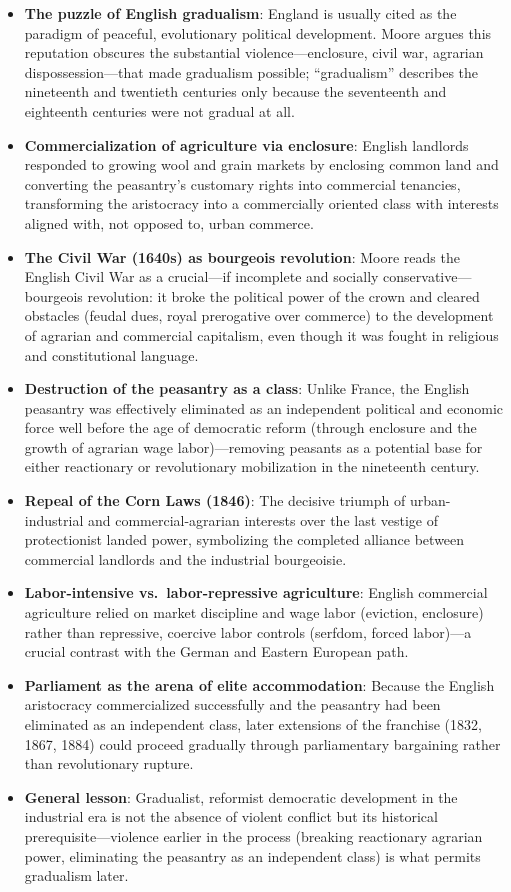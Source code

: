\documentclass[12pt]{article}
\begin{document}
\begin{itemize}[leftmargin=*, itemsep=4pt]
    \item \textbf{The puzzle of English gradualism}: England is usually cited as the paradigm of peaceful, evolutionary political development. Moore argues this reputation obscures the substantial violence---enclosure, civil war, agrarian dispossession---that made gradualism possible; ``gradualism'' describes the nineteenth and twentieth centuries only because the seventeenth and eighteenth centuries were not gradual at all.
    \item \textbf{Commercialization of agriculture via enclosure}: English landlords responded to growing wool and grain markets by enclosing common land and converting the peasantry's customary rights into commercial tenancies, transforming the aristocracy into a commercially oriented class with interests aligned with, not opposed to, urban commerce.
    \item \textbf{The Civil War (1640s) as bourgeois revolution}: Moore reads the English Civil War as a crucial---if incomplete and socially conservative---bourgeois revolution: it broke the political power of the crown and cleared obstacles (feudal dues, royal prerogative over commerce) to the development of agrarian and commercial capitalism, even though it was fought in religious and constitutional language.
    \item \textbf{Destruction of the peasantry as a class}: Unlike France, the English peasantry was effectively eliminated as an independent political and economic force well before the age of democratic reform (through enclosure and the growth of agrarian wage labor)---removing peasants as a potential base for either reactionary or revolutionary mobilization in the nineteenth century.
    \item \textbf{Repeal of the Corn Laws (1846)}: The decisive triumph of urban-industrial and commercial-agrarian interests over the last vestige of protectionist landed power, symbolizing the completed alliance between commercial landlords and the industrial bourgeoisie.
    \item \textbf{Labor-intensive vs.\ labor-repressive agriculture}: English commercial agriculture relied on market discipline and wage labor (eviction, enclosure) rather than repressive, coercive labor controls (serfdom, forced labor)---a crucial contrast with the German and Eastern European path.
    \item \textbf{Parliament as the arena of elite accommodation}: Because the English aristocracy commercialized successfully and the peasantry had been eliminated as an independent class, later extensions of the franchise (1832, 1867, 1884) could proceed gradually through parliamentary bargaining rather than revolutionary rupture.
    \item \textbf{General lesson}: Gradualist, reformist democratic development in the industrial era is not the absence of violent conflict but its historical prerequisite---violence earlier in the process (breaking reactionary agrarian power, eliminating the peasantry as an independent class) is what permits gradualism later.
\end{itemize}
\end{document}

